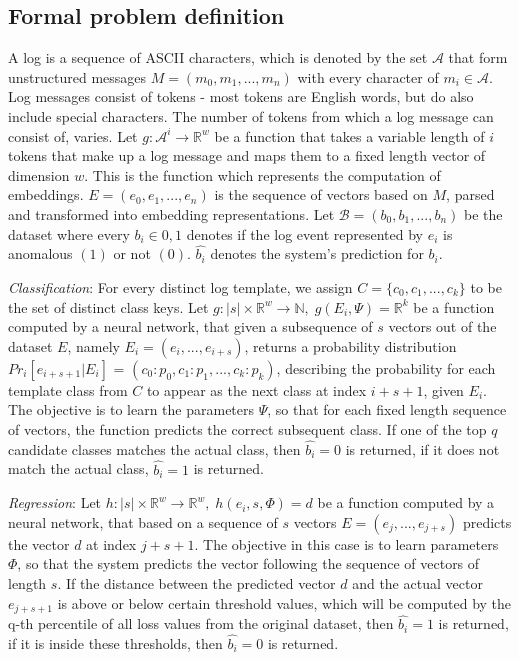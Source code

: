\subsection{Formal problem definition \label{sec:formal_problem_definition}}
A log is a sequence of ASCII characters, which is denoted by the set $\mathcal{A}$ that form unstructured messages $M = (m_0, m_1, ..., m_n)$ with every character of $m_i \in \mathcal{A}$. Log messages consist of tokens - most tokens are English words, but do also include special characters. The number of tokens from which a log message can consist of, varies. 
Let $g: \mathcal{A}^i \rightarrow \mathbb{R}^w$ be a function that takes a variable length of $i$ tokens that make up a log message and maps them to a fixed length vector of dimension $w$. This is the function which represents the computation of embeddings. $E = (e_0, e_1, ..., e_n)$ is the sequence of vectors based on $M$, parsed and transformed into embedding representations. Let $\mathcal{B} = (b_0, b_1, ..., b_n)$ be the dataset where every $b_i \in {0,1}$ denotes if the log event represented by $e_i$ is anomalous $(1)$ or not $(0)$. $\hat{b_i}$ denotes the system's prediction for $b_i$.

\textit{Classification}: For every distinct log template, we assign $C = \{c_0, c_1, ..., c_k\}$ to be the set of distinct class keys. Let $g: \left|s\right| \times \mathbb{R}^w \rightarrow \mathbb{N},\;  g(E_i, \Psi) = \mathbb{R}^k$ be a function computed by a neural network, that given a subsequence of $s$ vectors out of the dataset $E$, namely $E_i = (e_i, ..., e_{i+s})$, returns a probability distribution $Pr_i[e_{i+s+1}|E_i]$ = $(c_0: p_0, c_1: p_1, ..., c_k: p_k)$, describing the probability for each template class from $C$ to appear as the next class at index $i+s+1$, given $E_i$. The objective is to learn the parameters $\Psi$, so that for each fixed length sequence of vectors, the function predicts the correct subsequent class. If one of the top $q$ candidate classes matches the actual class, then $\hat{b_i} = 0$ is returned, if it does not match the actual class, $\hat{b_i} = 1$ is returned.

\textit{Regression}: Let $h: \left|s\right| \times \mathbb{R}^w \rightarrow \mathbb{R}^w, \; h(e_i, s, \Phi)=d$ be a function computed by a neural network, that based on a sequence of $s$ vectors $E = (e_j, ..., e_{j+s})$ predicts the vector $d$ at index $j+s+1$. The objective in this case is to learn parameters $\Phi$, so that the system predicts the vector following the sequence of vectors of length $s$. If the distance between the predicted vector $d$ and the actual vector $e_{j+s+1}$ is above or below certain threshold values, which will be computed by the q-th percentile of all loss values from the original dataset, then $\hat{b_i} = 1$ is returned, if it is inside these thresholds, then $\hat{b_i} = 0$ is returned.

